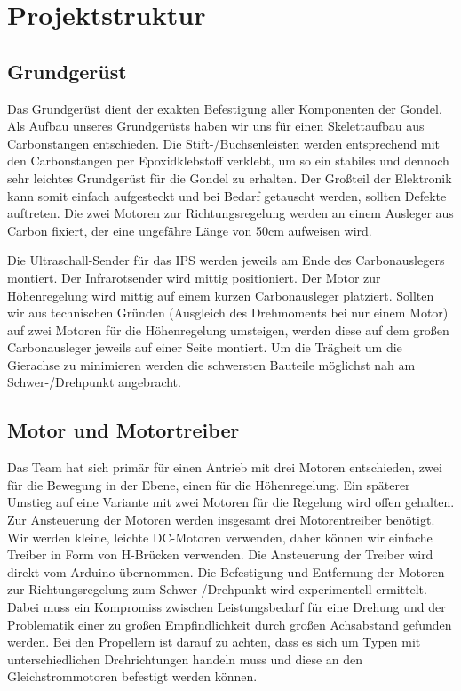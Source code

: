 \documentclass[lang=ngerman,inputenc=utf8,fontsize=10pt]{ldvarticle}
\begin{document}
\section{Projektstruktur}

\subsection*{Grundgerüst}
Das Grundgerüst dient der exakten Befestigung aller Komponenten der Gondel.\\
Als Aufbau unseres Grundgerüsts haben wir uns für einen Skelettaufbau aus Carbonstangen entschieden. Die Stift-/Buchsenleisten werden entsprechend mit den Carbonstangen per Epoxidklebstoff verklebt, um so ein stabiles und dennoch sehr leichtes Grundgerüst für die Gondel zu erhalten. Der Großteil der Elektronik kann somit einfach aufgesteckt und bei Bedarf getauscht werden, sollten Defekte auftreten. Die zwei Motoren zur Richtungsregelung werden an einem Ausleger aus Carbon fixiert, der eine ungefähre Länge von 50cm aufweisen wird. 

Die Ultraschall-Sender für das IPS werden jeweils am Ende des Carbonauslegers montiert. Der Infrarotsender wird mittig positioniert. Der Motor zur Höhenregelung wird mittig auf einem kurzen Carbonausleger platziert. Sollten wir aus technischen Gründen (Ausgleich des Drehmoments bei nur einem Motor) auf zwei Motoren für die Höhenregelung umsteigen, werden diese auf dem großen Carbonausleger jeweils auf einer Seite montiert. Um die Trägheit um die Gierachse zu minimieren werden die schwersten Bauteile möglichst nah am Schwer-/Drehpunkt angebracht.
\subsection*{Motor und Motortreiber}
Das Team hat sich primär für einen Antrieb mit drei Motoren entschieden, zwei für die Bewegung in der Ebene, einen für die Höhenregelung. Ein späterer Umstieg auf eine Variante mit zwei Motoren für die Regelung wird offen gehalten. Zur Ansteuerung der Motoren werden insgesamt drei Motorentreiber benötigt. Wir werden kleine, leichte DC-Motoren verwenden, daher können wir einfache Treiber in Form von H-Brücken verwenden. Die Ansteuerung der Treiber wird direkt vom Arduino übernommen. Die Befestigung und Entfernung der Motoren zur Richtungsregelung zum Schwer-/Drehpunkt wird experimentell ermittelt. Dabei muss ein Kompromiss zwischen Leistungsbedarf für eine Drehung und der Problematik einer zu großen Empfindlichkeit durch großen Achsabstand gefunden werden. Bei den Propellern ist darauf zu achten, dass es sich um Typen mit unterschiedlichen Drehrichtungen handeln muss und diese an den Gleichstrommotoren befestigt werden können.
\end{document}

